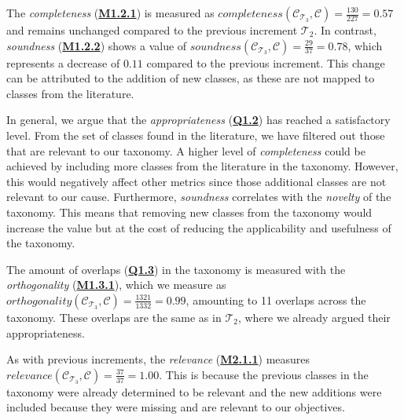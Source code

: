\begin{sloppypar}
    The \emph{completeness} (\hyperref[tab:gqm_taxonomy_validation]{\textbf{M1.2.1}}) is measured as $completeness(\mathcal{C}_{\mathcal{T}_3}, \mathcal{C}) = \frac{130}{227} = 0.57$ and remains unchanged compared to the previous increment $\mathcal{T}_2$. In contrast, \emph{soundness} (\hyperref[tab:gqm_taxonomy_validation]{\textbf{M1.2.2}}) shows a value of $soundness(\mathcal{C}_{\mathcal{T}_3}, \mathcal{C}) = \frac{29}{37} = 0.78$, which represents a decrease of $0.11$ compared to the previous increment. This change can be attributed to the addition of new classes, as these are not mapped to classes from the literature.

    In general, we argue that the \emph{appropriateness} (\hyperref[tab:gqm_taxonomy_validation]{\textbf{Q1.2}}) has reached a satisfactory level. From the set of classes found in the literature, we have filtered out those that are relevant to our taxonomy. A higher level of \emph{completeness} could be achieved by including more classes from the literature in the taxonomy. However, this would negatively affect other metrics since those additional classes are not relevant to our cause. Furthermore, \emph{soundness} correlates with the \emph{novelty} of the taxonomy. This means that removing new classes from the taxonomy would increase the value but at the cost of reducing the applicability and usefulness of the taxonomy.
\end{sloppypar}

\begin{sloppypar}
    The amount of overlaps (\hyperref[tab:gqm_taxonomy_validation]{\textbf{Q1.3}}) in the taxonomy is measured with the \emph{orthogonality} (\hyperref[tab:gqm_taxonomy_validation]{\textbf{M1.3.1}}), which we measure as $orthogonality(\mathcal{C}_{\mathcal{T}_3}, \mathcal{C}) = \frac{1321}{1332} = 0.99$, amounting to 11 overlaps across the taxonomy. These overlaps are the same as in $\mathcal{T}_2$, where we already argued their appropriateness.
\end{sloppypar}

\begin{sloppypar}
    As with previous increments, the \emph{relevance} (\hyperref[tab:gqm_taxonomy_validation]{\textbf{M2.1.1}}) measures $relevance(\mathcal{C}_{\mathcal{T}_3}, \mathcal{C}) = \frac{37}{37} = 1.00$. This is because the previous classes in the taxonomy were already determined to be relevant and the new additions were included because they were missing and are relevant to our objectives.
\end{sloppypar}

